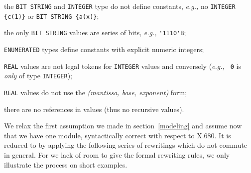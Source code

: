 \begin{itemize}
  \bitem the \texttt{\small BIT STRING} and \texttt{\small INTEGER}
  type do not define constants, \emph{e.g.,} no {\small \verb+INTEGER {c(1)}+}
  or {\small \verb+BIT STRING {a(x)}+};

  \bitem the only \texttt{\small BIT STRING} values are series of
  bits, \emph{e.g.,} \verb+'1110'B+;

  \bitem \texttt{\small ENUMERATED} types define constants with
  explicit numeric integers;

  \bitem \texttt{\small REAL} values are not legal tokens for
  \texttt{\small INTEGER} values and conversely (\emph{e.g.,} \texttt{\small
  0} is \emph{only} of type \texttt{\small INTEGER});
  
  \bitem \texttt{\small REAL} values do not use the
  \emph{(mantissa, base, exponent)} form;

  \bitem there are no references in values (thus no recursive values).

\end{itemize}

\medskip

We relax the first assumption we made in section~\ref{modeling} and
assume now that we have one \ASN module, syntactically correct with
respect to \mbox{X.680}. It is reduced to \core by applying the
following series of rewritings which do not commute in general.  For
we lack of room to give the formal rewriting rules, we only illustrate
the process on short examples.

\medskip

